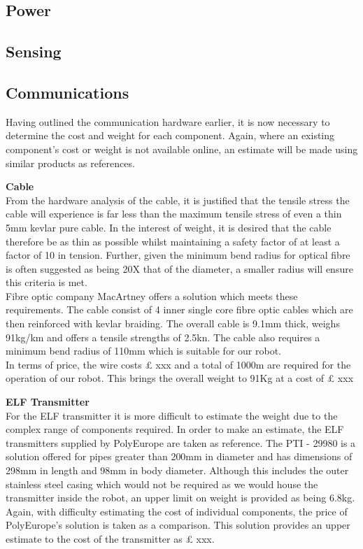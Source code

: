 \documentclass[11pt]{article}		%
\begin{document}
		\subsection{Power}
		
		\subsection{Sensing}

		\subsection{Communications}
		Having outlined the communication hardware earlier, it is now necessary to determine the cost and weight for each component. Again, where an existing component’s cost or weight is not available online, an estimate will be made using similar products as references. 
		
		\textbf{Cable}\\
		From the hardware analysis of the cable, it is justified that the tensile stress the cable will experience is far less than the maximum tensile stress of even a thin 5mm kevlar pure cable. In the interest of weight, it is desired that the cable therefore be as thin as possible whilst maintaining a safety factor of at least a factor of 10 in tension. Further, given the minimum bend radius for optical fibre is often suggested as being 20X that of the diameter, a smaller radius will ensure this criteria is met.\\
    	\hspace*{3ex}Fibre optic company MacArtney offers a solution which meets these requirements. The cable consist of 4 inner single core fibre optic cables which are then reinforced with kevlar braiding. The overall cable is 9.1mm thick, weighs 91kg/km and offers a tensile strengths of 2.5kn. The cable also requires a minimum bend radius of 110mm which is suitable for our robot. \\
    	\hspace*{3ex}In terms of price, the wire costs £ xxx and a total of 1000m are required for the operation of our robot. This brings the overall weight to 91Kg at a cost of £ xxx 

        \textbf{ELF Transmitter}\\
        For the ELF transmitter it is more difficult to estimate the weight due to the complex range of components required. In order to make an estimate, the ELF transmitters supplied by PolyEurope are taken as reference. The PTI - 29980 is a solution offered for pipes greater than 200mm in diameter and has dimensions of 298mm in length and 98mm in body diameter. Although this includes the outer stainless steel casing which would not be required as we would house the transmitter inside the robot, an upper limit on weight is provided as being 6.8kg.\\
        \hspace*{3ex}Again, with difficulty estimating the cost of individual components, the price of PolyEurope’s solution is taken as a comparison. This solution provides an upper estimate to the cost of the transmitter as £ xxx. 
    
\end{document}
